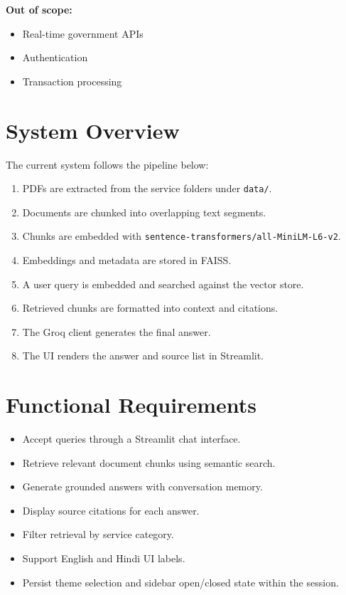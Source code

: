 \documentclass[11pt]{article}
\begin{document}
\textbf{Out of scope:}
\begin{itemize}
    \item Real-time government APIs
    \item Authentication
    \item Transaction processing
\end{itemize}

\section{System Overview}
The current system follows the pipeline below:
\begin{enumerate}
    \item PDFs are extracted from the service folders under \texttt{data/}.
    \item Documents are chunked into overlapping text segments.
    \item Chunks are embedded with \texttt{sentence-transformers/all-MiniLM-L6-v2}.
    \item Embeddings and metadata are stored in FAISS.
    \item A user query is embedded and searched against the vector store.
    \item Retrieved chunks are formatted into context and citations.
    \item The Groq client generates the final answer.
    \item The UI renders the answer and source list in Streamlit.
\end{enumerate}

\section{Functional Requirements}
\begin{itemize}
    \item Accept queries through a Streamlit chat interface.
    \item Retrieve relevant document chunks using semantic search.
    \item Generate grounded answers with conversation memory.
    \item Display source citations for each answer.
    \item Filter retrieval by service category.
    \item Support English and Hindi UI labels.
    \item Persist theme selection and sidebar open/closed state within the session.
\end{itemize}
\end{document}
